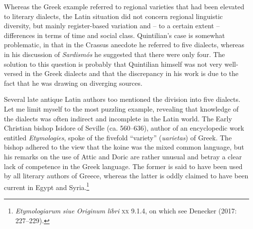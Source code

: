 Whereas the Greek example referred to regional varieties that had been elevated to literary dialects, the Latin situation did not concern regional linguistic diversity, but mainly register-based variation and – to a certain extent – differences in terms of time and social class. Quintilian’s case is somewhat problematic, in that in the Crassus anecdote he referred to five dialects, whereas in his discussion of \textit{Sardismós} he suggested that there were only four. The solution to this question is probably that Quintilian himself was not very well-versed in the Greek dialects and that the discrepancy in his work is due to the fact that he was drawing on diverging sources.

Several late antique Latin authors too mentioned the division into five dialects. Let me limit myself to the most puzzling example, revealing that knowledge of the dialects was often indirect and incomplete in the Latin world. The Early Christian bishop Isidore of Seville (ca. 560–636), author of an encyclopedic work entitled \textit{Etymologies}, spoke of the fivefold “variety” (\textit{uarietas}) of Greek. The bishop adhered to the view that the koine was the mixed common language, but his remarks on the use of Attic and Doric are rather unusual and betray a clear lack of competence in the Greek language. The former is said to have been used by all literary authors of Greece, whereas the latter is oddly claimed to have been current in Egypt and Syria.\footnote{\textit{Etymologiarum} \textit{siue} \textit{Originum} \textit{libri} \textsc{xx} 9.1.4, on which see Denecker (2017: 227–229).}

